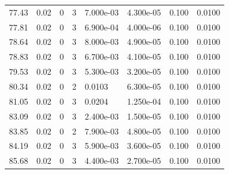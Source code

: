 \documentclass[preview]{standalone}
\begin{document}
{{{\begin{tabular}{L{1.2cm}C{1.2cm} C{0.3cm}C{0.5cm} C{1.4cm}C{1.4cm} C{1.4cm}C{1.4cm}}
  77.43  &  0.02  & 0     &  3 &  7.000e-03  & 4.300e-05  & 0.100 &  0.0100   \\ 
  77.81  &  0.02  & 0     &  3 &  6.900e-04  & 4.000e-06  & 0.100 &  0.0100   \\ 
  78.64  &  0.02  & 0     &  3 &  8.000e-03  & 4.900e-05  & 0.100 &  0.0100   \\ 
  78.83  &  0.02  & 0     &  3 &  6.700e-03  & 4.100e-05  & 0.100 &  0.0100   \\ 
  79.53  &  0.02  & 0     &  3 &  5.300e-03  & 3.200e-05  & 0.100 &  0.0100   \\ 
  80.34  &  0.02  & 0     &  2 &  0.0103  & 6.300e-05  & 0.100 &  0.0100   \\ 
  81.05  &  0.02  & 0     &  3 &  0.0204  & 1.250e-04  & 0.100 &  0.0100   \\ 
  83.09  &  0.02  & 0     &  3 &  2.400e-03  & 1.500e-05  & 0.100 &  0.0100   \\ 
  83.85  &  0.02  & 0     &  2 &  7.900e-03  & 4.800e-05  & 0.100 &  0.0100   \\ 
  84.19  &  0.02  & 0     &  3 &  5.900e-03  & 3.600e-05  & 0.100 &  0.0100   \\ 
  85.68  &  0.02  & 0     &  3 &  4.400e-03  & 2.700e-05  & 0.100 &  0.0100   \\ 
\hline 
\end{tabular} 

}}}
\end{document}
